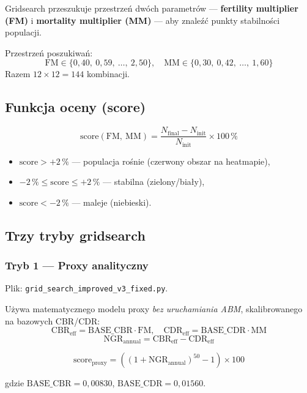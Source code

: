 \documentclass[11pt,a4paper]{article}
\begin{document}
Gridsearch przeszukuje przestrzeń dwóch parametrów --- \textbf{fertility multiplier (FM)} i \textbf{mortality multiplier (MM)} --- aby znaleźć punkty stabilności populacji.

Przestrzeń poszukiwań:
\[
\mathrm{FM} \in \{0{,}40,\ 0{,}59,\ \ldots,\ 2{,}50\}, \quad \mathrm{MM} \in \{0{,}30,\ 0{,}42,\ \ldots,\ 1{,}60\}
\]
Razem $12 \times 12 = 144$ kombinacji.

\subsection{Funkcja oceny (score)}

\begin{formulabox}
\[
\text{score}(\mathrm{FM},\ \mathrm{MM}) = \frac{N_{\text{final}} - N_{\text{init}}}{N_{\text{init}}} \times 100\,\%
\]
\end{formulabox}

\begin{itemize}
  \item $\text{score} > +2\,\%$ --- populacja rośnie (czerwony obszar na heatmapie),
  \item $-2\,\% \leq \text{score} \leq +2\,\%$ --- stabilna (zielony/biały),
  \item $\text{score} < -2\,\%$ --- maleje (niebieski).
\end{itemize}

\subsection{Trzy tryby gridsearch}

\subsubsection{Tryb 1 --- Proxy analityczny}

Plik: \texttt{grid\_search\_improved\_v3\_fixed.py}.

Używa matematycznego modelu proxy \emph{bez uruchamiania ABM}, skalibrowanego na bazowych CBR/CDR:
\[
\text{CBR}_{\text{eff}} = \text{BASE\_CBR} \cdot \mathrm{FM}, \quad \text{CDR}_{\text{eff}} = \text{BASE\_CDR} \cdot \mathrm{MM}
\]
\[
\text{NGR}_{\text{annual}} = \text{CBR}_{\text{eff}} - \text{CDR}_{\text{eff}}
\]
\begin{formulabox}
\[
\text{score}_{\text{proxy}} = \left( (1 + \text{NGR}_{\text{annual}})^{50} - 1 \right) \times 100
\]
\end{formulabox}
gdzie $\text{BASE\_CBR} = 0{,}00830$, $\text{BASE\_CDR} = 0{,}01560$.
\end{document}
